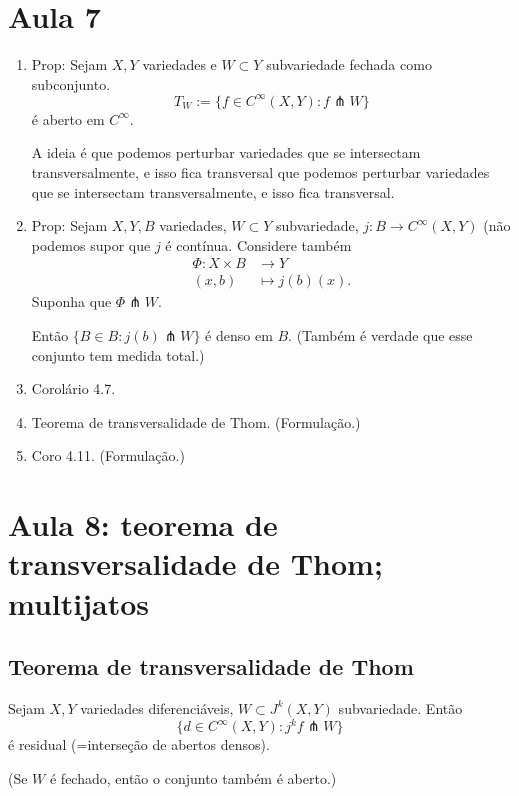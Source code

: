 \section{Aula 7}



\begin{enumerate}
\item Prop: Sejam \(X,Y\) variedades e \(W \subset Y\) subvariedade fechada como subconjunto. \[T_W:= \{f \in C^\infty(X,Y): f \pitchfork W\}\]
é aberto em \(C^\infty\).

{\color{7}A ideia é que podemos perturbar variedades que se intersectam transversalmente, e isso fica transversal que podemos perturbar variedades que se intersectam transversalmente, e isso fica transversal.}

\item Prop: Sejam \(X,Y,B\) variedades, \(W \subset Y\) subvariedade, \(j:B \to C^\infty(X,Y)\) (não podemos supor que \(j\) é contínua. Considere também
\begin{align*}
	\Phi: X \times B &\longrightarrow Y \\
	(x,b) &\longmapsto j(b)(x).
\end{align*}
Suponha que \(\Phi \pitchfork W\).

Então \(\{ B \in B : j(b) \pitchfork W\}\) é denso em \(B\). (Também é verdade que esse conjunto tem medida total.)
	
\item Corolário 4.7.
\item Teorema de transversalidade de Thom. (Formulação.)
\item Coro 4.11. (Formulação.)

\end{enumerate}

\section{Aula 8: teorema de transversalidade de Thom; multijatos}

\subsection{Teorema de transversalidade de Thom}

\begin{thm}\leavevmode
Sejam \(X, Y\) variedades diferenciáveis, \(W \subset J^k(X,Y)\) subvariedade. Então
\[\{ d \in C^\infty (X,Y): j^kf \pitchfork W\}\]
é residual (=interseção de abertos densos).

(Se \(W\) é fechado, então o conjunto também é aberto.)
\end{thm}

